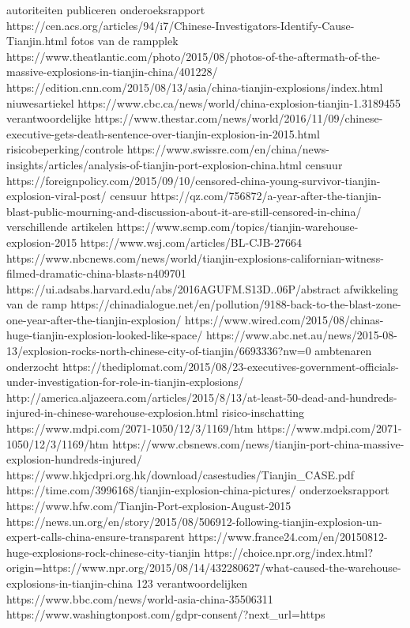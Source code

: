 autoriteiten publiceren onderoeksrapport
https://cen.acs.org/articles/94/i7/Chinese-Investigators-Identify-Cause-Tianjin.html
fotos van de rampplek
https://www.theatlantic.com/photo/2015/08/photos-of-the-aftermath-of-the-massive-explosions-in-tianjin-china/401228/
https://edition.cnn.com/2015/08/13/asia/china-tianjin-explosions/index.html
niuwesartiekel
https://www.cbc.ca/news/world/china-explosion-tianjin-1.3189455
verantwoordelijke
https://www.thestar.com/news/world/2016/11/09/chinese-executive-gets-death-sentence-over-tianjin-explosion-in-2015.html
risicobeperking/controle
https://www.swissre.com/en/china/news-insights/articles/analysis-of-tianjin-port-explosion-china.html
censuur
https://foreignpolicy.com/2015/09/10/censored-china-young-survivor-tianjin-explosion-viral-post/
censuur
https://qz.com/756872/a-year-after-the-tianjin-blast-public-mourning-and-discussion-about-it-are-still-censored-in-china/
verschillende artikelen
https://www.scmp.com/topics/tianjin-warehouse-explosion-2015
https://www.wsj.com/articles/BL-CJB-27664
https://www.nbcnews.com/news/world/tianjin-explosions-californian-witness-filmed-dramatic-china-blasts-n409701
https://ui.adsabs.harvard.edu/abs/2016AGUFM.S13D..06P/abstract
afwikkeling van de ramp
https://chinadialogue.net/en/pollution/9188-back-to-the-blast-zone-one-year-after-the-tianjin-explosion/
https://www.wired.com/2015/08/chinas-huge-tianjin-explosion-looked-like-space/
https://www.abc.net.au/news/2015-08-13/explosion-rocks-north-chinese-city-of-tianjin/6693336?nw=0
ambtenaren onderzocht
https://thediplomat.com/2015/08/23-executives-government-officials-under-investigation-for-role-in-tianjin-explosions/
http://america.aljazeera.com/articles/2015/8/13/at-least-50-dead-and-hundreds-injured-in-chinese-warehouse-explosion.html
risico-inschatting
https://www.mdpi.com/2071-1050/12/3/1169/htm
https://www.mdpi.com/2071-1050/12/3/1169/htm
https://www.cbsnews.com/news/tianjin-port-china-massive-explosion-hundreds-injured/
https://www.hkjcdpri.org.hk/download/casestudies/Tianjin_CASE.pdf
https://time.com/3996168/tianjin-explosion-china-pictures/
onderzoeksrapport
https://www.hfw.com/Tianjin-Port-explosion-August-2015
https://news.un.org/en/story/2015/08/506912-following-tianjin-explosion-un-expert-calls-china-ensure-transparent
https://www.france24.com/en/20150812-huge-explosions-rock-chinese-city-tianjin
https://choice.npr.org/index.html?origin=https://www.npr.org/2015/08/14/432280627/what-caused-the-warehouse-explosions-in-tianjin-china
123 verantwoordelijken
https://www.bbc.com/news/world-asia-china-35506311
https://www.washingtonpost.com/gdpr-consent/?next_url=https%
